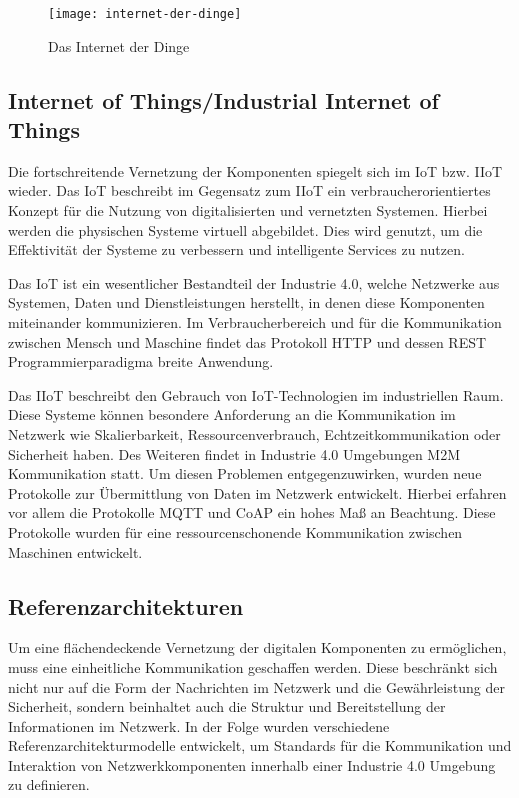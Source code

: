 \begin{figure}[h]
  \centering
  \texttt{[image: internet-der-dinge]}
  \caption{Das Internet der Dinge}
  \label{Grundlagen:Das Internet der Dinge}
\end{figure}

\subsection{Internet of Things/Industrial Internet of Things}
\label{Grundlagen:IoT/IIoT}
Die fortschreitende Vernetzung der Komponenten spiegelt sich im \ac{IoT} bzw. \ac{IIoT} wieder. Das \ac{IoT} beschreibt im Gegensatz zum \ac{IIoT} ein verbraucherorientiertes Konzept für die Nutzung von digitalisierten und vernetzten Systemen. Hierbei werden die physischen Systeme virtuell abgebildet. Dies wird genutzt, um die Effektivität der Systeme zu verbessern und intelligente Services zu nutzen.

Das \ac{IoT} ist ein wesentlicher Bestandteil der Industrie 4.0, welche Netzwerke aus Systemen, Daten und Dienstleistungen herstellt, in denen diese Komponenten miteinander kommunizieren. Im Verbraucherbereich und für die Kommunikation zwischen Mensch und Maschine findet das Protokoll \ac{HTTP} und dessen \ac{REST} Programmierparadigma breite Anwendung. 

Das \ac{IIoT} beschreibt den Gebrauch von \ac{IoT}-Technologien im industriellen Raum. Diese Systeme können besondere Anforderung an die Kommunikation im Netzwerk wie Skalierbarkeit, Ressourcenverbrauch, Echtzeitkommunikation oder Sicherheit haben. Des Weiteren findet in Industrie 4.0 Umgebungen \ac{M2M} Kommunikation statt. Um diesen Problemen entgegenzuwirken, wurden neue Protokolle zur Übermittlung von Daten im Netzwerk entwickelt. Hierbei erfahren vor allem die Protokolle \ac{MQTT} und \ac{CoAP} ein hohes Maß an Beachtung. Diese Protokolle wurden für eine ressourcenschonende Kommunikation zwischen Maschinen entwickelt.

\subsection{Referenzarchitekturen}
Um eine flächendeckende Vernetzung der digitalen Komponenten zu ermöglichen, muss eine einheitliche Kommunikation geschaffen werden. Diese beschränkt sich nicht nur auf die Form der Nachrichten im Netzwerk und die Gewährleistung der Sicherheit, sondern beinhaltet auch die Struktur und Bereitstellung der Informationen im Netzwerk. In der Folge wurden verschiedene Referenzarchitekturmodelle entwickelt, um Standards für die Kommunikation und Interaktion von Netzwerkkomponenten innerhalb einer Industrie 4.0 Umgebung zu definieren.

